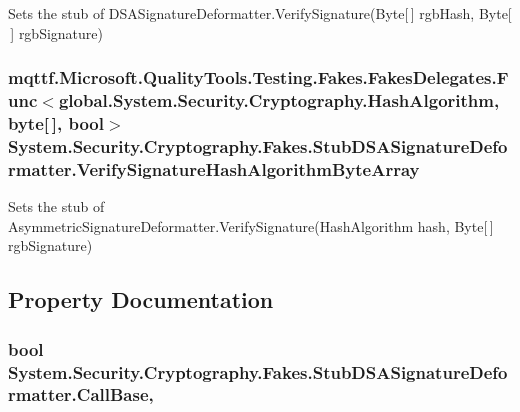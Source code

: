 Sets the stub of D\-S\-A\-Signature\-Deformatter.\-Verify\-Signature(\-Byte\mbox{[}$\,$\mbox{]} rgb\-Hash, Byte\mbox{[}$\,$\mbox{]} rgb\-Signature)

\hypertarget{class_system_1_1_security_1_1_cryptography_1_1_fakes_1_1_stub_d_s_a_signature_deformatter_a5e0499e4ac8a809e111beae7992e1dc3}{
\subsubsection[{Verify\-Signature\-Hash\-Algorithm\-Byte\-Array}]{\setlength{\rightskip}{0pt plus 5cm}mqttf.\-Microsoft.\-Quality\-Tools.\-Testing.\-Fakes.\-Fakes\-Delegates.\-Func$<$global.\-System.\-Security.\-Cryptography.\-Hash\-Algorithm, byte\mbox{[}$\,$\mbox{]}, bool$>$ System.\-Security.\-Cryptography.\-Fakes.\-Stub\-D\-S\-A\-Signature\-Deformatter.\-Verify\-Signature\-Hash\-Algorithm\-Byte\-Array}}\label{class_system_1_1_security_1_1_cryptography_1_1_fakes_1_1_stub_d_s_a_signature_deformatter_a5e0499e4ac8a809e111beae7992e1dc3}


Sets the stub of Asymmetric\-Signature\-Deformatter.\-Verify\-Signature(\-Hash\-Algorithm hash, Byte\mbox{[}$\,$\mbox{]} rgb\-Signature)



\subsection{Property Documentation}
\hypertarget{class_system_1_1_security_1_1_cryptography_1_1_fakes_1_1_stub_d_s_a_signature_deformatter_a79b1d27c59215ae8e815f75a0c555d71}{
\subsubsection[{Call\-Base}]{\setlength{\rightskip}{0pt plus 5cm}bool System.\-Security.\-Cryptography.\-Fakes.\-Stub\-D\-S\-A\-Signature\-Deformatter.\-Call\-Base\hspace{0.3cm}{\ttfamily [get]}, {\ttfamily [set]}}}\label{class_system_1_1_security_1_1_cryptography_1_1_fakes_1_1_stub_d_s_a_signature_deformatter_a79b1d27c59215ae8e815f75a0c555d71}


